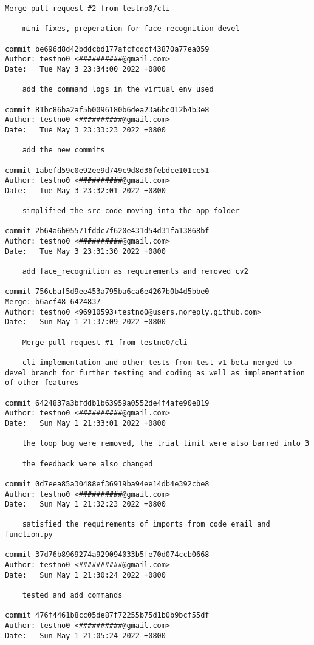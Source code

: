 \documentclass[12pt]{article}
\begin{document}
\begin{lstlisting}[caption={\texttt{git} log of the development.}]
	Merge pull request #2 from testno0/cli

	mini fixes, preperation for face recognition devel

commit be696d8d42bddcbd177afcfcdcf43870a77ea059
Author: testno0 <##########@gmail.com>
Date:   Tue May 3 23:34:00 2022 +0800

	add the command logs in the virtual env used

commit 81bc86ba2af5b0096180b6dea23a6bc012b4b3e8
Author: testno0 <##########@gmail.com>
Date:   Tue May 3 23:33:23 2022 +0800

	add the new commits

commit 1abefd59c0e92ee9d749c9d8d36febdce101cc51
Author: testno0 <##########@gmail.com>
Date:   Tue May 3 23:32:01 2022 +0800

	simplified the src code moving into the app folder

commit 2b64a6b05571fddc7f620e431d54d31fa13868bf
Author: testno0 <##########@gmail.com>
Date:   Tue May 3 23:31:30 2022 +0800

	add face_recognition as requirements and removed cv2

commit 756cbaf5d9ee453a795ba6ca6e4267b0b4d5bbe0
Merge: b6acf48 6424837
Author: testno0 <96910593+testno0@users.noreply.github.com>
Date:   Sun May 1 21:37:09 2022 +0800

	Merge pull request #1 from testno0/cli

	cli implementation and other tests from test-v1-beta merged to devel branch for further testing and coding as well as implementation of other features

commit 6424837a3bfddb1b63959a0552de4f4afe90e819
Author: testno0 <##########@gmail.com>
Date:   Sun May 1 21:33:01 2022 +0800

	the loop bug were removed, the trial limit were also barred into 3

	the feedback were also changed

commit 0d7eea85a30488ef36919ba94ee14db4e392cbe8
Author: testno0 <##########@gmail.com>
Date:   Sun May 1 21:32:23 2022 +0800

	satisfied the requirements of imports from code_email and function.py

commit 37d76b8969274a929094033b5fe70d074ccb0668
Author: testno0 <##########@gmail.com>
Date:   Sun May 1 21:30:24 2022 +0800

	tested and add commands

commit 476f4461b8cc05de87f72255b75d1b0b9bcf55df
Author: testno0 <##########@gmail.com>
Date:   Sun May 1 21:05:24 2022 +0800


\end{lstlisting}
\end{document}
